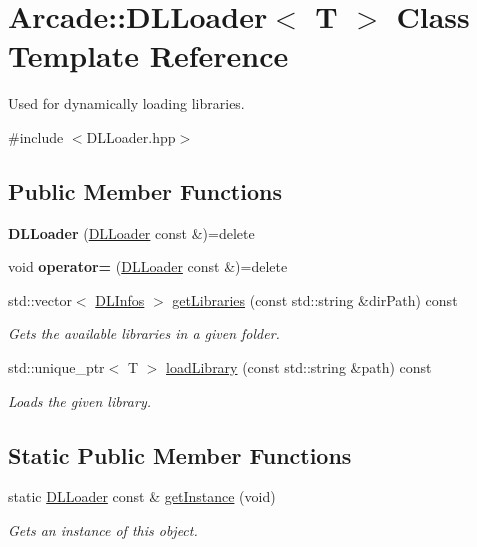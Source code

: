\hypertarget{classArcade_1_1DLLoader}{}\section{Arcade\+::D\+L\+Loader$<$ T $>$ Class Template Reference}
\label{classArcade_1_1DLLoader}


Used for dynamically loading libraries.  




{\ttfamily \#include $<$D\+L\+Loader.\+hpp$>$}

\subsection*{Public Member Functions}
\begin{DoxyCompactItemize}
\item 
\mbox{\label{classArcade_1_1DLLoader_ae3bd52e8aff2d1009f0eeb169d18290a}} 
{\bfseries D\+L\+Loader} (\mbox{\hyperlink{classArcade_1_1DLLoader}{D\+L\+Loader}} const \&)=delete
\item 
\mbox{\label{classArcade_1_1DLLoader_a7669292663e67263a50cfa36be22c5d7}} 
void {\bfseries operator=} (\mbox{\hyperlink{classArcade_1_1DLLoader}{D\+L\+Loader}} const \&)=delete
\item 
std\+::vector$<$ \mbox{\hyperlink{structArcade_1_1DLInfos}{D\+L\+Infos}} $>$ \mbox{\hyperlink{classArcade_1_1DLLoader_a3c3fa714d6fbaf4481a1fe015a3e18ab}{get\+Libraries}} (const std\+::string \&dir\+Path) const
\begin{DoxyCompactList}\small\item\em Gets the available libraries in a given folder. \end{DoxyCompactList}\item 
std\+::unique\+\_\+ptr$<$ T $>$ \mbox{\hyperlink{classArcade_1_1DLLoader_ad9fb1241a01190637402f3866c695272}{load\+Library}} (const std\+::string \&path) const
\begin{DoxyCompactList}\small\item\em Loads the given library. \end{DoxyCompactList}\end{DoxyCompactItemize}
\subsection*{Static Public Member Functions}
\begin{DoxyCompactItemize}
\item 
static \mbox{\hyperlink{classArcade_1_1DLLoader}{D\+L\+Loader}} const  \& \mbox{\hyperlink{classArcade_1_1DLLoader_a7a75048aa067e9e75aaf5faae6cfa4c1}{get\+Instance}} (void)
\begin{DoxyCompactList}\small\item\em Gets an instance of this object. \end{DoxyCompactList}\end{DoxyCompactItemize}


